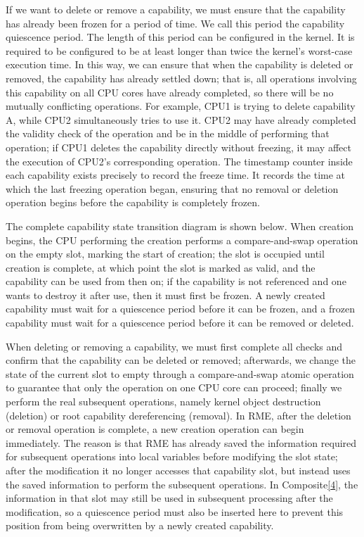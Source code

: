 If we want to delete or remove a capability, we must ensure that the capability has already been frozen for a period of time. We call this period the capability quiescence period. The length of this period can be configured in the kernel. It is required to be configured to be at least longer than twice the kernel's worst-case execution time. In this way, we can ensure that when the capability is deleted or removed, the capability has already settled down; that is, all operations involving this capability on all CPU cores have already completed, so there will be no mutually conflicting operations. For example, CPU1 is trying to delete capability A, while CPU2 simultaneously tries to use it. CPU2 may have already completed the validity check of the operation and be in the middle of performing that operation; if CPU1 deletes the capability directly without freezing, it may affect the execution of CPU2's corresponding operation. The timestamp counter inside each capability exists precisely to record the freeze time. It records the time at which the last freezing operation began, ensuring that no removal or deletion operation begins before the capability is completely frozen.

The complete capability state transition diagram is shown below. When creation begins, the CPU performing the creation performs a compare-and-swap operation on the empty slot, marking the start of creation; the slot is occupied until creation is complete, at which point the slot is marked as valid, and the capability can be used from then on; if the capability is not referenced and one wants to destroy it after use, then it must first be frozen. A newly created capability must wait for a quiescence period before it can be frozen, and a frozen capability must wait for a quiescence period before it can be removed or deleted.

When deleting or removing a capability, we must first complete all checks and confirm that the capability can be deleted or removed; afterwards, we change the state of the current slot to empty through a compare-and-swap atomic operation to guarantee that only the operation on one CPU core can proceed; finally we perform the real subsequent operations, namely kernel object destruction (deletion) or root capability dereferencing (removal). In RME, after the deletion or removal operation is complete, a new creation operation can begin immediately. The reason is that RME has already saved the information required for subsequent operations into local variables before modifying the slot state; after the modification it no longer accesses that capability slot, but instead uses the saved information to perform the subsequent operations. In Composite\hyperref[cite:2-4]{{[}4{]}}, the information in that slot may still be used in subsequent processing after the modification, so a quiescence period must also be inserted here to prevent this position from being overwritten by a newly created capability.

